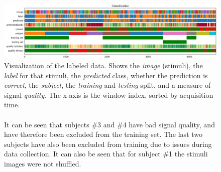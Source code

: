         \begin{landscape}
            \begin{figure}
                \centering
                \includegraphics[width=24cm]{img/timebars.png}
                \caption{Visualization of the labeled data. Shows the \emph{image} (stimuli), the \emph{label} for that stimuli, the \emph{predicted} class, whether the prediction is \emph{correct}, the \emph{subject}, the \emph{training} and \emph{testing} split, and a measure of signal \emph{quality}. The x-axis is the window index, sorted by acquisition time.
                \\ 
                \\
                It can be seen that subjects \#3 and \#4 have bad signal quality, and have therefore been excluded from the training set. The last two subjects have also been excluded from training due to issues during data collection. It can also be seen that for subject \#1 the stimuli images were not shuffled.}\label{fig:timebars}
            \end{figure}
        \end{landscape}

